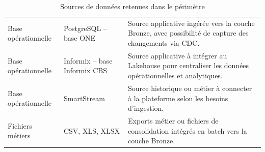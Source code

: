 \begin{table}[H]
\centering
\caption{Sources de données retenues dans le périmètre}
\label{tab:sources-donnees}
\PFETableSetup
{}
\begin{tabularx}{\textwidth}{|p{}|p{}|Y|}
\hline
{}
 &  &  \\
\hline
Base opérationnelle & PostgreSQL -- base ONE & Source applicative ingérée vers la couche Bronze, avec possibilité de capture des changements via CDC. \\
\hline
Base opérationnelle & Informix -- base Informix CBS & Source applicative à intégrer au Lakehouse pour centraliser les données opérationnelles et analytiques. \\
\hline
Base opérationnelle & SmartStream & Source historique ou métier à connecter à la plateforme selon les besoins d'ingestion. \\
\hline
Fichiers métiers & CSV, XLS, XLSX & Exports métier ou fichiers de consolidation intégrés en batch vers la couche Bronze. \\
\hline
\end{tabularx}
\end{table}

